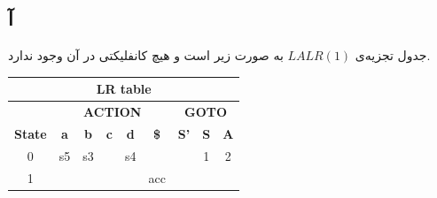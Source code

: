 \documentclass{article}
\begin{document}
\subsection{آ}
جدول تجزیه‌ی $LALR(1)$ به صورت زیر است و هیچ کانفلیکتی در آن وجود ندارد.
\begin{latin}
\begin{table}[H]
\begin{tabular}{|ccccccccc|}
\hline
\multicolumn{9}{|c|}{\textbf{LR table}}                                                                                                                                                                                                                                                                                                                        \\ \hline
\multicolumn{1}{|c|}{}                                 & \multicolumn{5}{c|}{\textbf{ACTION}}                                                                                                                                                    & \multicolumn{3}{c|}{\textbf{GOTO}}                                                                          \\ \cline{2-9} 
\multicolumn{1}{|c|}{\multirow{-2}{*}{\textbf{State}}} & \multicolumn{1}{c|}{\textbf{a}} & \multicolumn{1}{c|}{\textbf{b}} & \multicolumn{1}{c|}{\textbf{c}} & \multicolumn{1}{c|}{\textbf{d}} & \multicolumn{1}{c|}{\textbf{\$}}                & \multicolumn{1}{c|}{\textbf{S'}} & \multicolumn{1}{c|}{\textbf{S}}               & \textbf{A}               \\ \hline
\multicolumn{1}{|c|}{{\color[HTML]{0000FF} 0}}         & \multicolumn{1}{c|}{s5}         & \multicolumn{1}{c|}{s3}         & \multicolumn{1}{c|}{}           & \multicolumn{1}{c|}{s4}         & \multicolumn{1}{c|}{}                           & \multicolumn{1}{c|}{}            & \multicolumn{1}{c|}{{\color[HTML]{0000FF} 1}} & {\color[HTML]{0000FF} 2} \\ \hline
\multicolumn{1}{|c|}{{\color[HTML]{0000FF} 1}}         & \multicolumn{1}{c|}{}           & \multicolumn{1}{c|}{}           & \multicolumn{1}{c|}{}           & \multicolumn{1}{c|}{}           & \multicolumn{1}{c|}{{\color[HTML]{008000} acc}} & \multicolumn{1}{c|}{}            & \multicolumn{1}{c|}{}                         &                          \\ \hline

\end{tabular}
\end{table}
\end{latin}
\end{document}
